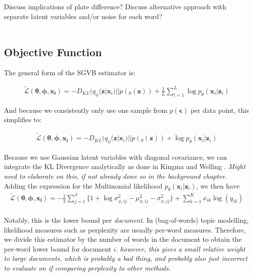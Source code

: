 \documentclass{report}
\begin{document}
Discuss implications of plate difference? Discuss alternative approach with separate latent variables and/or noise for each word?\\ \\

\subsection{Objective Function}
The general form of the SGVB estimator is:

\begin{align}
\tilde{\mathcal{L}}(\boldsymbol{\theta}, \boldsymbol{\phi}, \mathbf{x_i}) = -D_{KL}(q_\phi (\mathbf{z}|\mathbf{x}_i)||p(_\theta(\mathbf{z}))  + \frac{1}{L}\sum_{l=1}^{L}\log p_\theta(\mathbf{x}_i|\mathbf{z}_i)
\end{align}

And because we consistently only use one sample from $p(\boldsymbol{\epsilon})$ per data point, this simplifies to:

\begin{align}
\tilde{\mathcal{L}}(\boldsymbol{\theta}, \boldsymbol{\phi}, \mathbf{x_i}) = -D_{KL}(q_\phi (\mathbf{z}|\mathbf{x}_i)||p(_\theta(\mathbf{z}))  + \log p_\theta(\mathbf{x}_i|\mathbf{z}_i)
\end{align}

Because we use Gaussian latent variables with diagonal covariance, we can integrate the KL Divergence analytically as done in Kingma and Welling \cite{kingma2013auto}. \textit{Might need to elaborate on this, if not already done so in the background chapter}. Adding the expression for the Multinomial likelihood $p_\theta(\mathbf{x}_i|\mathbf{z}_i)$, we then have
\begin{align}
\tilde{\mathcal{L}}(\boldsymbol{\theta}, \boldsymbol{\phi}, \mathbf{x_i}) = - \frac{1}{2}\sum\limits_{j=1}^{J}\{1+\log \sigma_{\phi ,ij}^2 - \mu_{\phi,ij}^2 - \sigma_{\phi ,ij}^2\}  + 
\sum_{k=1}^K x_{ik} \log (y_{ik})
\end{align}
\\
Notably, this is the lower bound per \textit{document}. In (bag-of-words) topic modelling, likelihood measures such as perplexity are usually per-word measures. Therefore, we divide this estimator by the number of words in the document to obtain the per-word lower bound for document $i$.
\textit{however, this gives a small relative weight to large documents, which is probably a bad thing, and probably also just incorrect to evaluate on if comparing perplexity to other methods.}
\end{document}
